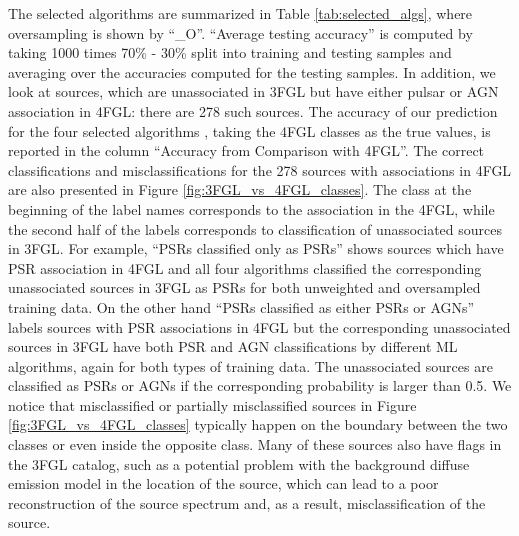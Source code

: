 The selected algorithms are summarized in Table \ref{tab:selected_algs}, where oversampling is shown by ``\_O''.
``Average testing accuracy'' is computed by taking 1000 times 70\% - 30\% split into training and testing samples and averaging over the 
accuracies computed for the testing samples.
In addition, we look at sources, which are unassociated in 3FGL but have either pulsar or AGN association in 4FGL: there are 278 such sources.
The accuracy of our prediction for the four selected algorithms , taking the 4FGL classes as the true values, is reported in the column ``Accuracy from Comparison with 4FGL''.
The correct classifications and misclassifications for the 278 sources with associations in 4FGL are also presented in Figure \ref{fig:3FGL_vs_4FGL_classes}.
The class at the beginning of the label names corresponds to the association in the 4FGL, while the second half of the labels corresponds to classification of unassociated sources in 3FGL. For example, ``PSRs classified only as PSRs'' shows sources which have PSR association in 4FGL and all four algorithms classified the corresponding unassociated sources in 3FGL as PSRs for both unweighted and oversampled training data. On the other hand ``PSRs classified as either PSRs or AGNs'' labels sources with PSR associations in 4FGL but the corresponding unassociated sources in 3FGL have both PSR and AGN classifications by different ML algorithms, again for both types of training data.
The unassociated sources are classified as PSRs or AGNs if the corresponding probability is larger than 0.5.
We notice that misclassified or partially misclassified sources in Figure \ref{fig:3FGL_vs_4FGL_classes} typically happen on the boundary between the two classes or even inside the opposite class.
Many of these sources also have flags in the 3FGL catalog, such as a potential problem with the background diffuse emission model in the location of the source, which can lead to a poor reconstruction of the source spectrum and, as a result, misclassification of the source.




